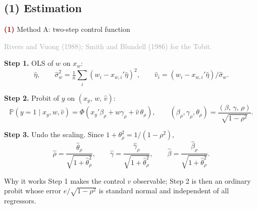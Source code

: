 \documentclass[aspectratio=169,11pt]{beamer}
\newcommand{\Pp}{\mathbb{P}}
\newcommand{\Part}[1]{\textcolor{DarkRed}{\textbf{(#1)}}}
\begin{document}
\subsection{(1) Estimation}

\begin{frame}{\Part{1} Method A: two-step control function}

\textcolor{DarkGray}{Rivers and Vuong (1988); Smith and Blundell (1986) for the Tobit.}

\vspace{0.3em}

\textbf{Step 1.} OLS of $w$ on $x_w$:
\[
\hat\eta,\qquad
\hat\sigma_w^2=\tfrac1n\textstyle\sum_i (w_i-x_{w,i}'\hat\eta)^2,\qquad
\hat v_i = (w_i - x_{w,i}'\hat\eta)/\hat\sigma_w .
\]

\textbf{Step 2.} Probit of $y$ on $(x_y,\,w,\,\hat v)$:
\[
\Pp(y=1\mid x_y,w,\hat v)
=\Phi\!\left(x_y'\beta_\rho + w\gamma_\rho + \hat v\,\theta_\rho\right),
\qquad
(\beta_\rho,\gamma_\rho,\theta_\rho)=\frac{(\beta,\,\gamma,\,\rho)}{\sqrt{1-\rho^2}} .
\]

\pause

\textbf{Step 3.} Undo the scaling. Since $1+\theta_\rho^2 = 1/(1-\rho^2)$,
\[
\hat\rho=\frac{\hat\theta_\rho}{\sqrt{1+\hat\theta_\rho^2}},
\qquad
\hat\gamma=\frac{\hat\gamma_\rho}{\sqrt{1+\hat\theta_\rho^2}},
\qquad
\hat\beta=\frac{\hat\beta_\rho}{\sqrt{1+\hat\theta_\rho^2}} .
\]

\pause

\begin{block}{Why it works}
Step 1 makes the control $v$ observable; Step 2 is then an ordinary probit
whose error $e/\sqrt{1-\rho^2}$ is standard normal and independent of all regressors.
\end{block}

\end{frame}
\end{document}
